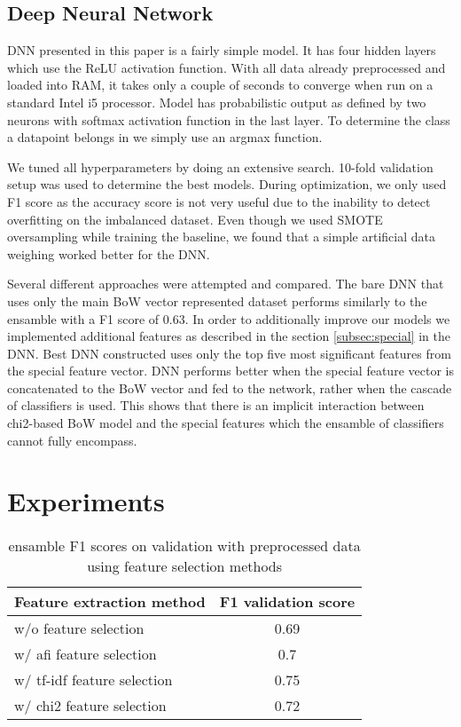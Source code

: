 \documentclass[10pt, a4paper]{article}
\begin{document}
\subsection{Deep Neural Network}

DNN presented in this paper is a fairly simple model. It has four hidden layers which use the ReLU activation function.
 With all data already preprocessed and loaded into RAM, it takes only a couple of seconds to converge when run on
 a standard Intel i5 processor. Model has probabilistic output as defined by two neurons with softmax activation
 function in the last layer. To determine the class a datapoint belongs in we simply use an argmax function. 

 We tuned all hyperparameters by doing an extensive search. 10-fold validation setup was used to determine the best
 models. During optimization, we only used F1 score as the accuracy score is not very useful due to the inability to
 detect overfitting on the imbalanced dataset. Even though we used SMOTE oversampling while training the
 baseline, we found that a simple artificial data weighing worked better for the DNN.

 Several different approaches were attempted and compared. The bare DNN that uses only the main BoW vector represented
 dataset performs similarly to the ensamble with a F1 score of 0.63. In order to additionally improve our models we
 implemented additional features as described in the section \ref{subsec:special} in the DNN. Best DNN constructed uses only the top five
 most significant features from the special feature vector. DNN performs better when the special feature vector is
 concatenated to the BoW vector and fed to the network, rather when the cascade of classifiers is used. This shows that
 there is an implicit interaction between chi2-based BoW model and the special features which the ensamble of classifiers cannot
 fully encompass.

\section{Experiments}
\begin{table}[htp]
\caption{ensamble F1 scores on validation with preprocessed data using feature selection methods\label{table:feature-selection-validation}}
\begin{center}
\begin{tabular}{lc}
\toprule
Feature extraction method & F1 validation score\\
\midrule
w/o feature selection & 0.69\\
w/ afi feature selection & 0.7\\
w/ tf-idf feature selection & 0.75\\
w/ chi2 feature selection & 0.72\\
\bottomrule
\end{tabular}
\end{center}
\end{table}
\end{document}
